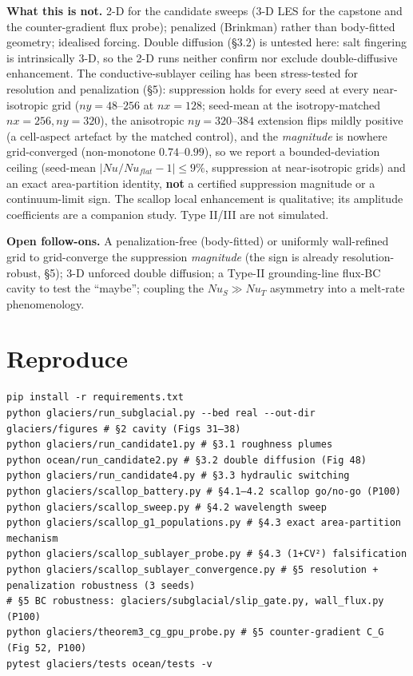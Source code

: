 \documentclass[tc, manuscript]{copernicus}
\begin{document}
\textbf{What this is not.} 2-D for the candidate sweeps (3-D LES for the capstone and the counter-gradient flux probe); penalized (Brinkman) rather than body-fitted geometry; idealised forcing. Double diffusion (§3.2) is untested here: salt fingering is intrinsically 3-D, so the 2-D runs neither confirm nor exclude double-diffusive enhancement. The conductive-sublayer ceiling has been stress-tested for resolution and penalization (§5): suppression holds for every seed at every near-isotropic grid ($ny=48\mbox{--}256$ at $nx=128$; seed-mean at the isotropy-matched $nx=256, ny=320$), the anisotropic $ny=320\mbox{--}384$ extension flips mildly positive (a cell-aspect artefact by the matched control), and the \emph{magnitude} is nowhere grid-converged (non-monotone $0.74\mbox{--}0.99$), so we report a bounded-deviation ceiling (seed-mean $|Nu/Nu_{flat}-1|\le 9\%$, suppression at near-isotropic grids) and an exact area-partition identity, \textbf{not} a certified suppression magnitude or a continuum-limit sign. The scallop local enhancement is qualitative; its amplitude coefficients are a companion study. Type II/III are not simulated.

\textbf{Open follow-ons.} A penalization-free (body-fitted) or uniformly wall-refined grid to grid-converge the suppression \emph{magnitude} (the sign is already resolution-robust, §5); 3-D unforced double diffusion; a Type-II grounding-line flux-BC cavity to test the ``maybe''; coupling the $Nu_{S}\gg Nu_{T}$ asymmetry into a melt-rate phenomenology.

\section{Reproduce}

\begin{verbatim}
pip install -r requirements.txt
python glaciers/run_subglacial.py --bed real --out-dir glaciers/figures # §2 cavity (Figs 31–38)
python glaciers/run_candidate1.py # §3.1 roughness plumes
python ocean/run_candidate2.py # §3.2 double diffusion (Fig 48)
python glaciers/run_candidate4.py # §3.3 hydraulic switching
python glaciers/scallop_battery.py # §4.1–4.2 scallop go/no-go (P100)
python glaciers/scallop_sweep.py # §4.2 wavelength sweep
python glaciers/scallop_g1_populations.py # §4.3 exact area-partition mechanism
python glaciers/scallop_sublayer_probe.py # §4.3 (1+CV²) falsification
python glaciers/scallop_sublayer_convergence.py # §5 resolution + penalization robustness (3 seeds)
# §5 BC robustness: glaciers/subglacial/slip_gate.py, wall_flux.py (P100)
python glaciers/theorem3_cg_gpu_probe.py # §5 counter-gradient C_G (Fig 52, P100)
pytest glaciers/tests ocean/tests -v
\end{verbatim}
\end{document}
